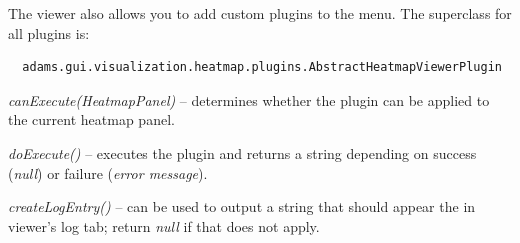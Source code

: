 \documentclass[a4paper]{book}
\begin{document}
The viewer also allows you to add custom plugins to the menu. The superclass
for all plugins is:
\begin{verbatim}
  adams.gui.visualization.heatmap.plugins.AbstractHeatmapViewerPlugin
\end{verbatim}
\begin{tight_itemize}
  \item \textit{canExecute(HeatmapPanel)} -- determines whether the plugin can
  be applied to the current heatmap panel.
  \item \textit{doExecute()} -- executes the plugin and returns a string
  depending on success (\textit{null}) or failure (\textit{error message}).
  \item \textit{createLogEntry()} -- can be used to output a string that
  should appear the in viewer's log tab; return \textit{null} if that does
  not apply.
\end{tight_itemize}


\end{document}
